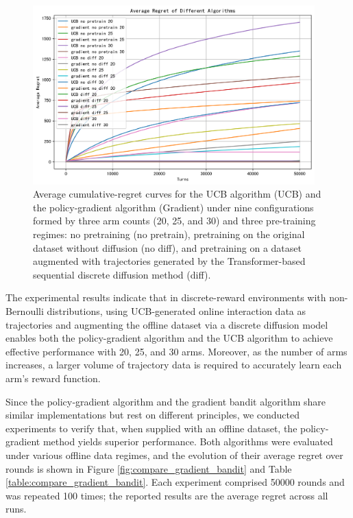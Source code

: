 \begin{figure}[htbp]
    \centering
    \includegraphics[width=0.97\textwidth]{./Img/stochastic_bandit/non_bern.png}
    \caption{Average cumulative-regret curves for the UCB algorithm (UCB) and the policy-gradient algorithm (Gradient) under nine configurations formed by three arm counts (20, 25, and 30) and three pre-training regimes: no pretraining (no pretrain), pretraining on the original dataset without diffusion (no diff), and pretraining on a dataset augmented with trajectories generated by the Transformer-based sequential discrete diffusion method (diff).}
    \label{fig:non_bern}
\end{figure}



The experimental results indicate that in discrete-reward environments with non-Bernoulli distributions, using UCB-generated online interaction data as trajectories and augmenting the offline dataset via a discrete diffusion model enables both the policy-gradient algorithm and the UCB algorithm to achieve effective performance with 20, 25, and 30 arms. Moreover, as the number of arms increases, a larger volume of trajectory data is required to accurately learn each arm’s reward function.

Since the policy‐gradient algorithm and the gradient bandit algorithm share similar implementations but rest on different principles, we conducted experiments to verify that, when supplied with an offline dataset, the policy‐gradient method yields superior performance. Both algorithms were evaluated under various offline data regimes, and the evolution of their average regret over rounds is shown in Figure \ref{fig:compare_gradient_bandit} and Table \ref{table:compare_gradient_bandit}. Each experiment comprised 50000 rounds and was repeated 100 times; the reported results are the average regret across all runs.

